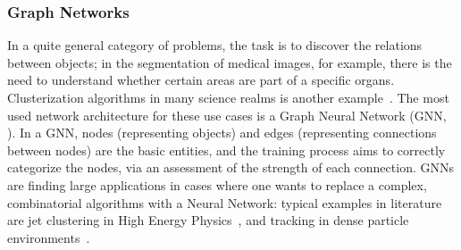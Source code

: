 
\subsubsection{Graph Networks}
In a quite general category of problems, the task is to discover the relations between objects; in the  segmentation of medical images, for example, there is the need to understand whether certain areas are part of a specific organs. Clusterization algorithms in many science realms is another example~\cite{Shlomi2021}.
The most used  network architecture for these use cases is a Graph Neural Network (GNN, \cite{Scarselli2009}).
In a GNN, nodes (representing objects) and edges (representing connections between nodes) are the basic entities, and the training process aims to correctly categorize the nodes, via an assessment of the strength of each connection.
GNNs are finding large applications in cases where one wants to replace a complex, combinatorial algorithms with a Neural Network: typical examples in literature are jet clustering in High Energy Physics~\cite{Ju2020}, and tracking in dense particle environments~\cite{Ju2020det}.


% 


